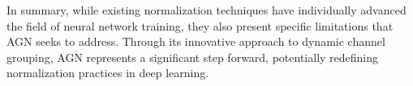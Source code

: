 

In summary, while existing normalization techniques have individually advanced the field of neural network training, they also present specific limitations that AGN seeks to address. Through its innovative approach to dynamic channel grouping, AGN represents a significant step forward, potentially redefining normalization practices in deep learning.